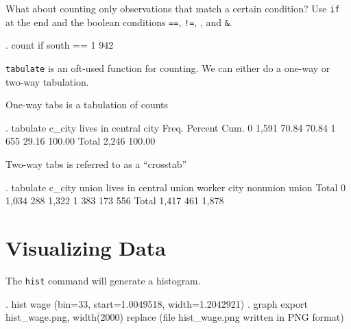 \documentclass[]{article}
\begin{document}
What about counting only observations that match a certain condition?
Use \texttt{if} at the end and the boolean conditions \texttt{==},
\texttt{!=}, \texttt{\textbar{}}, and \texttt{\&}.

\begin{stlog}
. count if south == 1
  942
{\smallskip}
\end{stlog}

\texttt{tabulate} is an oft-used function for counting. We can either do
a one-way or two-way tabulation.

One-way tabs is a tabulation of counts

\begin{stlog}
. tabulate c_city
{\smallskip}
   lives in {\VBAR}
    central {\VBAR}
       city {\VBAR}      Freq.     Percent        Cum.
          0 {\VBAR}      1,591       70.84       70.84
          1 {\VBAR}        655       29.16      100.00
      Total {\VBAR}      2,246      100.00
{\smallskip}
\end{stlog}

Two-way tabs is referred to as a ``crosstab''

\begin{stlog}
. tabulate c_city union
{\smallskip}
  lives in {\VBAR}
   central {\VBAR}     union worker
      city {\VBAR}  nonunion      union {\VBAR}     Total
         0 {\VBAR}     1,034        288 {\VBAR}     1,322 
         1 {\VBAR}       383        173 {\VBAR}       556 
     Total {\VBAR}     1,417        461 {\VBAR}     1,878 
{\smallskip}
{\smallskip}
\end{stlog}

\section{Visualizing Data}\label{visualizing-data}

The \texttt{hist} command will generate a histogram.

\begin{stlog}
. hist wage
(bin=33, start=1.0049518, width=1.2042921)
{\smallskip}
. graph export hist_wage.png, width(2000) replace
(file hist_wage.png written in PNG format)
{\smallskip}
\end{stlog}
\end{document}
